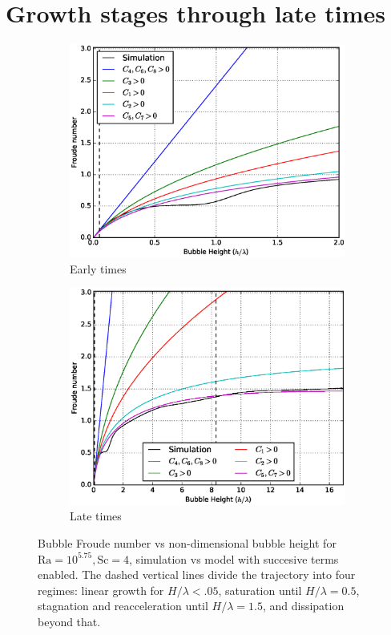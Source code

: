 \section{Growth stages through late times}

\begin{figure}
\begin{subfigure}[b]{\columnwidth}
\includegraphics[width=\columnwidth]{figs/Cascade-short-4-1}
\caption{Early times}
\end{subfigure}
\begin{subfigure}[b]{\columnwidth}
\includegraphics[width=\columnwidth]{figs/Cascade-4-1}
\caption{Late times}
\end{subfigure}
\caption{ 
Bubble Froude number vs non-dimensional bubble height for $\text{Ra} = 10^{5.75}, \text{Sc} = 4$, simulation vs model with succesive terms enabled.
The dashed vertical lines divide the trajectory into four regimes: linear growth for $H/\lambda < .05$, saturation until $H / \lambda = 0.5$, stagnation and reacceleration until $H / \lambda = 1.5$, and dissipation beyond that.
}
\end{figure}

